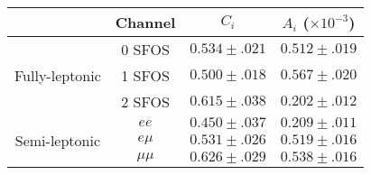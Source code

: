 \begin{tabular}{|cc||c|c|}
\hline
& Channel & $C_i$  & $A_i$ ($\times 10^{-3}$)\\
\hline\hline
\multirow{3}{*}{Fully-leptonic} & 0 SFOS &  $0.534 \pm .021$ & $0.512 \pm .019$ \\
				& 1 SFOS &  $0.500 \pm .018$ & $0.567 \pm .020$ \\
                                & 2 SFOS &  $0.615 \pm .038$ & $0.202 \pm .012$ \\
\hline
\multirow{3}{*}{Semi-leptonic} & $ee$     & $0.450 \pm .037$ & $0.209 \pm .011$\\
                               & $e\mu$   & $0.531 \pm .026$ & $0.519 \pm .016$\\
                               & $\mu\mu$ & $0.626 \pm .029$ & $0.538 \pm .016$\\
\hline
\end{tabular}
